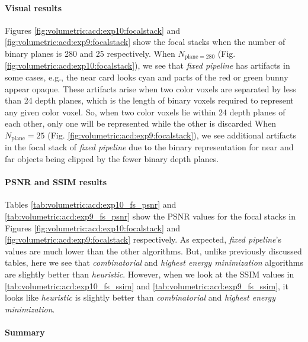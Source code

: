 \paragraph{Visual results}
Figures \ref{fig:volumetric:acd:exp10:focalstack} and \ref{fig:volumetric:acd:exp9:focalstack} show the focal stacks when the number of binary planes is 280 and 25 respectively. 
When $N_{\text{plane}=280}$ (Fig. \ref{fig:volumetric:acd:exp10:focalstack}), we see that \emph{fixed pipeline} has artifacts in some cases, e.g., the near card looks cyan and parts of the red or green bunny appear opaque. 
These artifacts arise when two color voxels are separated by less than 24 depth planes, which is the length of binary voxels required to represent any given color voxel. So, when two color voxels lie within 24 depth planes of each other, only one will be represented while the other is discarded
When $N_{\text{plane}}=25$ (Fig. \ref{fig:volumetric:acd:exp9:focalstack}), we see additional artifacts in the focal stack of \emph{fixed pipeline} due to the binary representation for near and far objects being clipped by the fewer binary depth planes.  

\paragraph{PSNR and SSIM results}




Tables \ref{tab:volumetric:acd:exp10_fs_psnr} and \ref{tab:volumetric:acd:exp9_fs_psnr} show the PSNR values for the focal stacks in Figures \ref{fig:volumetric:acd:exp10:focalstack} and \ref{fig:volumetric:acd:exp9:focalstack} respectively. As expected, \emph{fixed pipeline}'s values are much lower than the other algorithms. But, unlike previously discussed tables, here we see that \emph{combinatorial} and \emph{highest energy minimization} algorithms are slightly better than \emph{heuristic}. However, when we look at the SSIM values in \ref{tab:volumetric:acd:exp10_fs_ssim} and \ref{tab:volumetric:acd:exp9_fs_ssim}, it looks like \emph{heuristic} is slightly better than \emph{combinatorial} and \emph{highest energy minimization}.

\paragraph{Summary}


